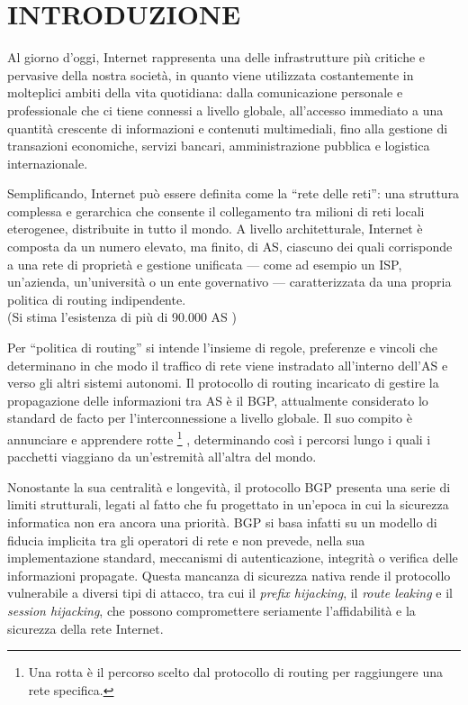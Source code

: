\documentclass[12pt,a4paper,twoside]{book}
\begin{document}
\setcounter{chapter}{-1}
\raggedbottom
\chapter{INTRODUZIONE} \label{chap:intro}
\pagestyle{plain}
\setcounter{page}{1}
\onehalfspacing

Al giorno d'oggi, Internet rappresenta una delle infrastrutture più critiche e pervasive della nostra società, in quanto viene utilizzata costantemente in molteplici ambiti della vita quotidiana: dalla comunicazione personale e professionale che ci tiene connessi a livello globale, all'accesso immediato a una quantità crescente di informazioni e contenuti multimediali, fino alla gestione di transazioni economiche, servizi bancari, amministrazione pubblica e logistica internazionale.

Semplificando, Internet può essere definita come la “rete delle reti”: una struttura complessa e gerarchica che consente il collegamento tra milioni di reti locali eterogenee, distribuite in tutto il mondo. A livello architetturale, Internet è composta da un numero elevato, ma finito, di \ac{AS}, ciascuno dei quali corrisponde a una rete di proprietà e gestione unificata — come ad esempio un \ac{ISP}, un’azienda, un’università o un ente governativo — caratterizzata da una propria politica di routing indipendente. \\
(Si stima l'esistenza di più di 90.000 \ac{AS} )

Per “politica di routing” si intende l’insieme di regole, preferenze e vincoli che determinano in che modo il traffico di rete viene instradato all’interno dell’\ac{AS} e verso gli altri sistemi autonomi. Il protocollo di routing incaricato di gestire la propagazione delle informazioni tra \ac{AS} è il \ac{BGP}, attualmente considerato lo standard de facto per l’interconnessione a livello globale. Il suo compito è annunciare e apprendere rotte \footnote{Una rotta è il percorso scelto dal protocollo di routing per raggiungere una rete specifica.}
, determinando così i percorsi lungo i quali i pacchetti viaggiano da un’estremità all’altra del mondo.

Nonostante la sua centralità e longevità, il protocollo \ac{BGP} presenta una serie di limiti strutturali, legati al fatto che fu progettato in un’epoca in cui la sicurezza informatica non era ancora una priorità. \ac{BGP} si basa infatti su un modello di fiducia implicita tra gli operatori di rete e non prevede, nella sua implementazione standard, meccanismi di autenticazione, integrità o verifica delle informazioni propagate. Questa mancanza di sicurezza nativa rende il protocollo vulnerabile a diversi tipi di attacco, tra cui il \textit{prefix hijacking}, il \textit{route leaking} e il \textit{session hijacking}, che possono compromettere seriamente l'affidabilità e la sicurezza della rete Internet.
\end{document}
